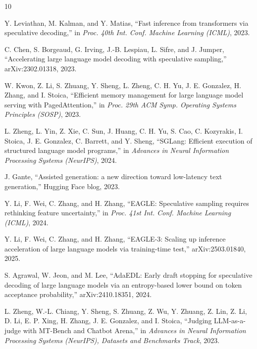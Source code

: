 \documentclass[conference]{IEEEtran}
\begin{document}
\begin{thebibliography}{10}

Y. Leviathan, M. Kalman, and Y. Matias,
``Fast inference from transformers via speculative decoding,''
in \emph{Proc. 40th Int. Conf. Machine Learning (ICML)}, 2023.

C. Chen, S. Borgeaud, G. Irving, J.-B. Lespiau, L. Sifre, and J. Jumper,
``Accelerating large language model decoding with speculative sampling,''
arXiv:2302.01318, 2023.

W. Kwon, Z. Li, S. Zhuang, Y. Sheng, L. Zheng, C. H. Yu, J. E. Gonzalez,
H. Zhang, and I. Stoica,
``Efficient memory management for large language model serving with
PagedAttention,'' in \emph{Proc. 29th ACM Symp. Operating Systems
Principles (SOSP)}, 2023.

L. Zheng, L. Yin, Z. Xie, C. Sun, J. Huang, C. H. Yu, S. Cao, C. Kozyrakis,
I. Stoica, J. E. Gonzalez, C. Barrett, and Y. Sheng,
``SGLang: Efficient execution of structured language model programs,''
in \emph{Advances in Neural Information Processing Systems (NeurIPS)}, 2024.

J. Gante,
``Assisted generation: a new direction toward low-latency text
generation,'' Hugging Face blog, 2023.

Y. Li, F. Wei, C. Zhang, and H. Zhang,
``EAGLE: Speculative sampling requires rethinking feature uncertainty,''
in \emph{Proc. 41st Int. Conf. Machine Learning (ICML)}, 2024.

Y. Li, F. Wei, C. Zhang, and H. Zhang,
``EAGLE-3: Scaling up inference acceleration of large language models via
training-time test,'' arXiv:2503.01840, 2025.

S. Agrawal, W. Jeon, and M. Lee,
``AdaEDL: Early draft stopping for speculative decoding of large language
models via an entropy-based lower bound on token acceptance probability,''
arXiv:2410.18351, 2024.

L. Zheng, W.-L. Chiang, Y. Sheng, S. Zhuang, Z. Wu, Y. Zhuang, Z. Lin,
Z. Li, D. Li, E. P. Xing, H. Zhang, J. E. Gonzalez, and I. Stoica,
``Judging LLM-as-a-judge with MT-Bench and Chatbot Arena,''
in \emph{Advances in Neural Information Processing Systems (NeurIPS),
Datasets and Benchmarks Track}, 2023.

\end{thebibliography}
\end{document}
